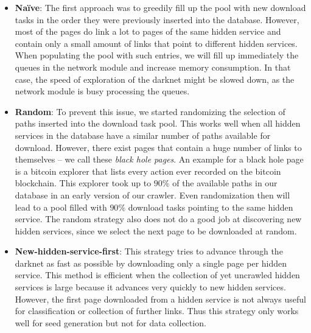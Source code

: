 \begin{itemize}
  \item \textbf{Na\"ive}: The first approach was to greedily fill up the pool with new download tasks in the order they were previously inserted into the database. However, most of the pages do link a lot to pages of the same hidden service and contain only a small amount of links that point to different hidden services. When populating the pool with such entries, we will fill up immediately the queues in the network module and increase memory consumption. In that case, the speed of exploration of the darknet might be slowed down, as the network module is busy processing the queues.
  \item \textbf{Random}: To prevent this issue, we started randomizing the selection of paths inserted into the download task pool. This works well when all hidden services in the database have a similar number of paths available for download. However, there exist pages that contain a huge number of links to themselves -- we call these \emph{black hole pages}. An example for a black hole page is a bitcoin explorer that lists every action ever recorded on the bitcoin blockchain. This explorer took up to $90\%$ of the available paths in our database in an early version of our crawler. Even randomization then will lead to a pool filled with $90\%$ download tasks pointing to the same hidden service. The random strategy also does not do a good job at discovering new hidden services, since we select the next page to be downloaded at random.
  \item \textbf{New-hidden-service-first}: This strategy tries to advance through the darknet as fast as possible by downloading only a single page per hidden service. This method is efficient when the collection of yet uncrawled hidden services is large because it advances very quickly to new hidden services. However, the first page downloaded from a hidden service is not always useful for classification or collection of further links. Thus this strategy only works well for seed generation but not for data collection.

\end{itemize}
